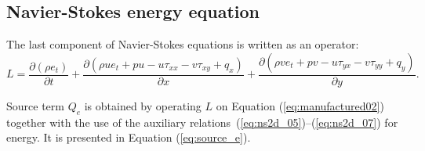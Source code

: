 \documentclass[10pt]{article}
\newcommand{\Diff}[2] {\dfrac{\partial( #1)}{\partial #2}}
\begin{document}
\begin{landscape}
\section{Navier-Stokes energy equation}


The last component of Navier-Stokes equations is written as an operator:
\begin{equation}
 \label{eq:ns2d_14}
L=\Diff{\rho e_t}{t} + \Diff{\rho ue_t +pu -u \tau_{xx}- v\tau_{xy} +q_x}{x}+\Diff{\rho ve_t +pv- u \tau_{yx} -v \tau_{yy} + q_y}{y}.
\end{equation}


Source term $Q_e$ is obtained by operating $L$ on Equation  (\ref{eq:manufactured02}) together with the use of the  auxiliary relations~(\ref{eq:ns2d_05})--(\ref{eq:ns2d_07}) for energy. It is presented in Equation (\ref{eq:source_e}).



\end{landscape}
\end{document}
